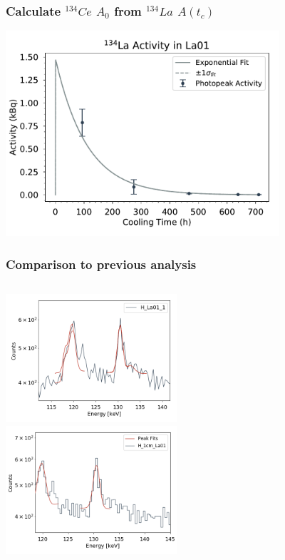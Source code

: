\documentclass[12pt,xcolor=dvipsnames]{beamer}
\begin{document}
\begin{frame}
\frametitle{Calculate $^{134}Ce$ $A_0$ from $^{134}La$ $A(t_c)$}
\includegraphics[width=4.0in]{decay_curves/La01_134LA}
\end{frame}

\begin{frame}
\frametitle{Comparison to previous analysis}
\begin{columns}[c]
\column{2.5in}
\includegraphics[width=2.5in]{old_fit.png}
\\
\column{2.5in}
\includegraphics[width=2.5in]{comparison_130.png}
\\
\end{columns}
\end{frame}
\end{document}
